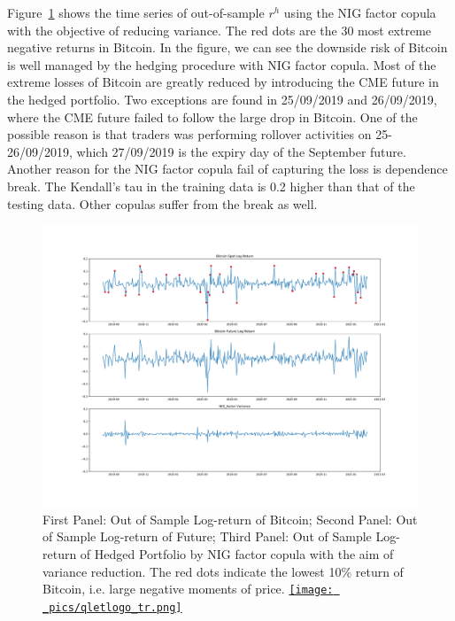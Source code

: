 Figure~\ref{fig:Gumbel} shows the time series of out-of-sample $r^h$ using the NIG factor copula with the
objective of reducing variance.
The red dots are the 30 most extreme negative returns in Bitcoin.
In the figure, we can see the downside risk of Bitcoin is well managed by the hedging procedure with NIG factor copula.
Most of the extreme losses of Bitcoin are greatly reduced by introducing the CME future in the hedged portfolio.
Two exceptions are found in 25/09/2019 and 26/09/2019, where the CME future failed to follow the large drop in Bitcoin.
One of the possible reason is that traders was performing rollover activities on 25-26/09/2019, which
27/09/2019 is the expiry day of the September future.
Another reason for the NIG factor copula fail of capturing the loss is dependence break.
The Kendall's tau in the training data is 0.2 higher than that of the testing data.
Other copulas suffer from the break as well. \medskip
%
\begin{figure}[th]
   \centering
   \includegraphics[width=\textwidth]{_pics/OOSreturns_compare.pdf}
   \caption{First Panel: Out of Sample Log-return of Bitcoin; Second Panel: Out of Sample Log-return of Future;
   Third Panel: Out of Sample Log-return of Hedged Portfolio by NIG factor copula with the aim of variance reduction.
   The red dots indicate the lowest 10\% return of Bitcoin, i.e. large negative moments of price.
   \href{http://www.quantlet.com/}{\texttt{[image: \_pics/qletlogo\_tr.png]}}}
   \label{fig:Gumbel}
\end{figure}

